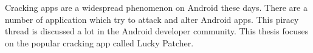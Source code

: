 Cracking apps are a widespread phenomenon on Android these days.
There are a number of application which try to attack and alter Android apps.
This piracy thread is discussed a lot in the Android developer community.
This thesis focuses on the popular cracking app called Lucky Patcher.
